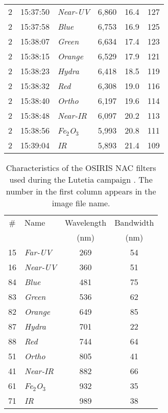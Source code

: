 \documentclass[3p,authoryear]{elsarticle}
\begin{document}
\begin{table}
\begin{tabular}{cllccc}
2 & 15:37:50 & {\it Near-UV}     & 6,860 & 16.4 & 127 \\
2 & 15:37:58 & {\it Blue}        & 6,753 & 16.9 & 125 \\
2 & 15:38:07 & {\it Green}       & 6,634 & 17.4 & 123 \\
2 & 15:38:15 & {\it Orange}      & 6,529 & 17.9 & 121 \\
2 & 15:38:23 & {\it Hydra}       & 6,418 & 18.5 & 119 \\
2 & 15:38:32 & {\it Red}         & 6,308 & 19.0 & 116 \\
2 & 15:38:40 & {\it Ortho}       & 6,197 & 19.6 & 114 \\
2 & 15:38:48 & {\it Near-IR}     & 6,097 & 20.2 & 113 \\
2 & 15:38:56 & {\it Fe$_2$O$_3$} & 5,993 & 20.8 & 111 \\
2 & 15:39:04 & {\it IR}          & 5,893 & 21.4 & 109 \\
\hline
\end{tabular}
\label{tab:data_sets}
\end{table}


\begin{table}
\centering
\caption{Characteristics of the OSIRIS NAC filters used during the Lutetia campaign \citep{K07}. The number in the first column appears in the image file name.}
\vspace{5mm}
\begin{tabular}{clcc}
\hline
\# & Name              & Wavelength & Bandwidth \\
     &                   & (nm)       & (nm) \\
\hline
15   & {\it Far-UV}      & 269        & 54 \\
16   & {\it Near-UV}     & 360        & 51 \\
84   & {\it Blue}        & 481        & 75 \\
83   & {\it Green}       & 536        & 62 \\
82   & {\it Orange}      & 649        & 85 \\
87   & {\it Hydra}       & 701        & 22 \\
88   & {\it Red}         & 744        & 64 \\
51   & {\it Ortho}       & 805        & 41 \\
41   & {\it Near-IR}     & 882        & 66 \\
61   & {\it Fe$_2$O$_3$} & 932        & 35 \\
71   & {\it IR}          & 989        & 38 \\
\hline
\end{tabular}
\label{tab:filters}
\end{table}
\end{document}
